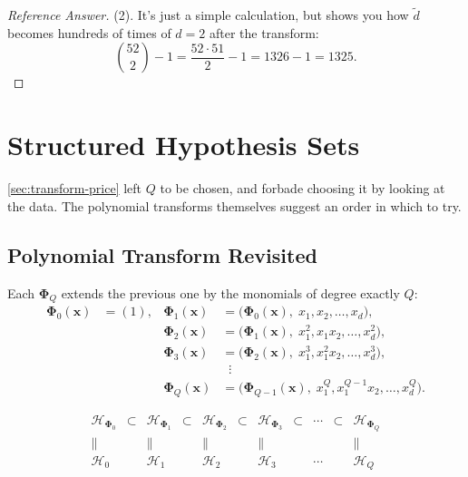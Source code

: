 \begin{proof}[Reference Answer]
    (2). It's just a simple calculation, but shows you how \(\tilde{d}\)
    becomes hundreds of times of \(d = 2\) after the transform:
    \[
        \binom{52}{2} - 1 = \frac{52 \cdot 51}{2} - 1 = 1326 - 1 = 1325 .
    \]
\end{proof}

\section{Structured Hypothesis Sets}\label{sec:structured-H}


\autoref{sec:transform-price} left \(Q\) to be chosen, and forbade choosing it
by looking at the data. The polynomial transforms themselves suggest an order
in which to try.

\subsection{Polynomial Transform Revisited}

Each \(\bm{\Phi}_Q\) extends the previous one by the monomials of degree
exactly \(Q\):
\begin{align*}
    \bm{\Phi}_0(\bm{x}) &= (1), &
    \bm{\Phi}_1(\bm{x}) &= \bigl( \bm{\Phi}_0(\bm{x}), \; x_1, x_2, \dots, x_d
    \bigr),\\
    &&\bm{\Phi}_2(\bm{x}) &= \bigl( \bm{\Phi}_1(\bm{x}), \; x_1^2, x_1 x_2,
    \dots, x_d^2 \bigr),\\
    &&\bm{\Phi}_3(\bm{x}) &= \bigl( \bm{\Phi}_2(\bm{x}), \; x_1^3, x_1^2 x_2,
    \dots, x_d^3 \bigr),\\
    &&&\;\;\vdots\\
    &&\bm{\Phi}_Q(\bm{x}) &= \bigl( \bm{\Phi}_{Q-1}(\bm{x}), \; x_1^Q,
    x_1^{Q-1} x_2, \dots, x_d^Q \bigr).
\end{align*}

\[
    \begin{array}{ccccccccccc}
        \mathcal{H}_{\bm{\Phi}_0} & \subset & \mathcal{H}_{\bm{\Phi}_1} &
        \subset & \mathcal{H}_{\bm{\Phi}_2} & \subset &
        \mathcal{H}_{\bm{\Phi}_3} & \subset & \cdots & \subset &
        \mathcal{H}_{\bm{\Phi}_Q}\\
        \| && \| && \| && \| &&&& \|\\
        \mathcal{H}_0 && \mathcal{H}_1 && \mathcal{H}_2 && \mathcal{H}_3 &&
        \cdots && \mathcal{H}_Q
    \end{array}
\]

